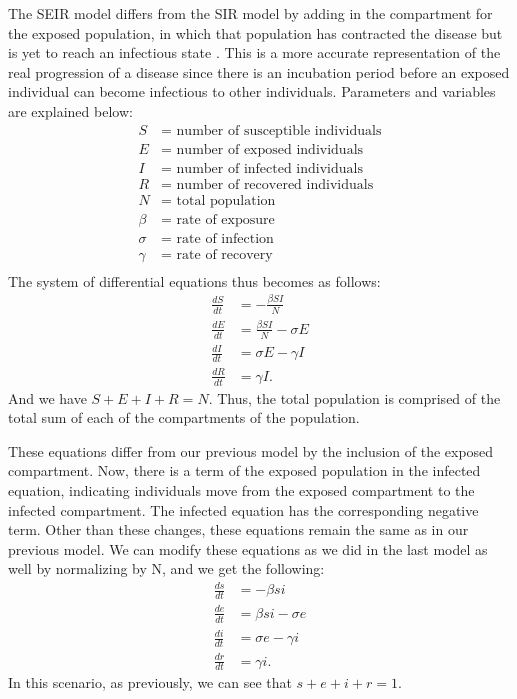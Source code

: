 \documentclass[12pt, a4paper]{article}
\begin{document}
    The SEIR model differs from the SIR model by adding in the compartment for the exposed population, in which that population has contracted the disease but is yet to reach an infectious state \cite{seir}. This is a more accurate representation of the real progression of a disease since there is an incubation period before an exposed individual can become infectious to other individuals. Parameters and variables are explained below:
        \begin{align*}
        S &= \text{ number of susceptible individuals}\\
        E &= \text{ number of exposed individuals}\\
        I &= \text{ number of infected individuals}\\
        R &= \text{ number of recovered individuals}\\
        N &= \text{ total population}\\
        \beta &= \text{ rate of exposure}\\
        \sigma &= \text{ rate of infection}\\
        \gamma &= \text{ rate of recovery}\\
        \end{align*}
        The system of differential equations thus becomes as follows:
        \begin{align*}
            \frac{dS}{dt} &= -\frac{\beta SI}{N} \\
            \frac{dE}{dt} &= \frac{\beta SI}{N} - \sigma E \\
            \frac{dI}{dt} &= \sigma E - \gamma I \\
            \frac{dR}{dt} &= \gamma I.
        \end{align*}
        And we have $S + E + I + R = N$.
        Thus, the total population is comprised of the total sum of each of the compartments of the population.
    
        These equations differ from our previous model by the inclusion of the exposed compartment. Now, there is a term of the exposed population in the infected equation, indicating individuals move from the exposed compartment to the infected compartment. The infected equation has the corresponding negative term. Other than these changes, these equations remain the same as in our previous model. We can modify these equations as we did in the last model as well by normalizing by N, and we get the following:
        \begin{align*}
            \frac{ds}{dt} &= -\beta si \\
            \frac{de}{dt} &= \beta si - \sigma e \\
            \frac{di}{dt} &= \sigma e - \gamma i \\
            \frac{dr}{dt} &= \gamma i.
        \end{align*}
        In this scenario, as previously, we can see that $s + e + i + r = 1$.
\end{document}
